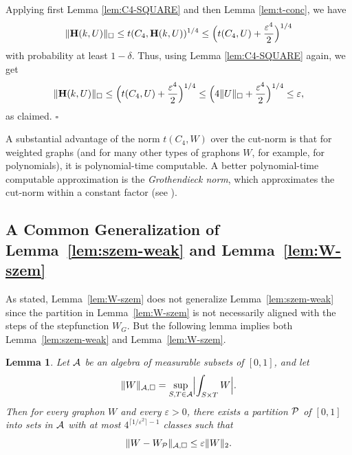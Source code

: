 \documentclass[12pt]{article}
\newtheorem{lemma}[theorem]{Lemma}
\numberwithin{equation}{section}
\newenvironment{proof}{\medskip\noindent{\bf Proof.
}}{\hfill$\square$\medskip}
\def\eps{\varepsilon}
\def\bH{{\mathbf H}}
\def\AA{{\cal A}}\def\BB{{\cal B}}\def\CC{{\cal C}}
\def\PP{{\cal P}}\def\QQ{{\cal Q}}\def\RR{{\cal R}}
\begin{document}
\begin{proof}
Applying first Lemma \ref{lem:C4-SQUARE} and then Lemma \ref{lem:t-conc}, we
have
\[
\|\bH(k,U)\|_\square \le t(C_4, \bH(k,U))^{1/4}
\leq \Bigl(t(C_4,U)+\frac{\eps^4}2\Bigr)^{1/4}
\]
with probability at least $1-\delta$.
Thus, using Lemma
\ref{lem:C4-SQUARE} again, we get
\[
\|\bH(k,U)\|_\square
\le\Bigl(t(C_4,U)+\frac{\eps^4}2\Bigr)^{1/4}\le
\Bigl(4\|U\|_\square+\frac{\eps^4}2\Bigr)^{1/4}\leq \eps,
\]
as claimed.
\end{proof}

A substantial advantage of the norm $t(C_4,W)$ over the cut-norm is
that for weighted graphs (and for many other types of graphons $W$,
for example, for polynomials), it is polynomial-time computable. A
better polynomial-time computable approximation is the {\it
Grothendieck norm}, which approximates the cut-norm within a
constant factor (see \cite{AN}).


\subsection{A Common Generalization of Lemma~\ref{lem:szem-weak}
and Lemma~\ref{lem:W-szem}} \label{sec:WRL-common}



As stated, Lemma~\ref{lem:W-szem} does not generalize
Lemma~\ref{lem:szem-weak} since the partition in
Lemma~\ref{lem:W-szem} is not necessarily aligned with the steps of
the stepfunction $W_G$.  But the following lemma implies both
Lemma~\ref{lem:szem-weak} and Lemma~\ref{lem:W-szem}.



\begin{lemma}\label{lem:SZEM-ALG}
Let $\AA$ be an algebra of measurable subsets of $[0,1]$, and let
\[
\|W\|_{\AA,\square}= {\sup_{S,T\in\AA}}\Bigl|\int_{S\times T}
W\Bigr|.
\]
Then for every graphon $W$ and every $\eps>0$, there exists a
partition $\PP$ of $[0,1]$ into sets in $\AA$ with at most $4^{\lceil
1/\eps^{2}\rceil -1}$ classes such that
\[
\|W-W_\PP\|_{\AA,\square}\le\eps\|W\|_2.
\]
\end{lemma}
\end{document}
